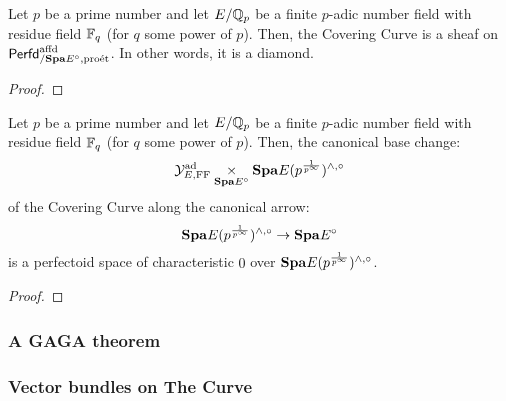                 \begin{lemma} \label{the_covering_curve_is_a_diamond}
                    Let $p$ be a prime number and let $E/\mathbb{Q}_p$ be a finite $p$-adic number field with residue field $\mathbb{F}_q$ (for $q$ some power of $p$). Then, the Covering Curve is a sheaf on $\mathsf{Perfd}^{\mathrm{affd}}_{/\mathbf{Spa} E^{\circ}, \mathrm{pro\acute{e}t}}$. In other words, it is a diamond.
                \end{lemma}
                    \begin{proof}
                        
                    \end{proof}
                \begin{proposition} \label{perfectoidifying_the_fargues_fontaine_curve}
                    Let $p$ be a prime number and let $E/\mathbb{Q}_p$ be a finite $p$-adic number field with residue field $\mathbb{F}_q$ (for $q$ some power of $p$). Then, the canonical base change:
                        $$\calY^{\ad}_{E, \FF} \x_{\Spa E^{\circ}} \Spa E(p^{\frac{1}{p^{\infty}}})^{\wedge, \circ}$$
                    of the Covering Curve along the canonical arrow:
                        $$\mathbf{Spa} E(p^{\frac{1}{p^{\infty}}})^{\wedge, \circ} \to \mathbf{Spa} E^{\circ}$$
                    is a perfectoid space of characteristic $0$ over $\mathbf{Spa} E(p^{\frac{1}{p^{\infty}}})^{\wedge, \circ}$. 
                \end{proposition}
                    \begin{proof}
                        
                    \end{proof}
                \begin{corollary} \label{coro: discontinuity_of_frobenius}
                    
                \end{corollary}
            
            \subsubsection{A GAGA theorem}
            
            \subsubsection{Vector bundles on The Curve}